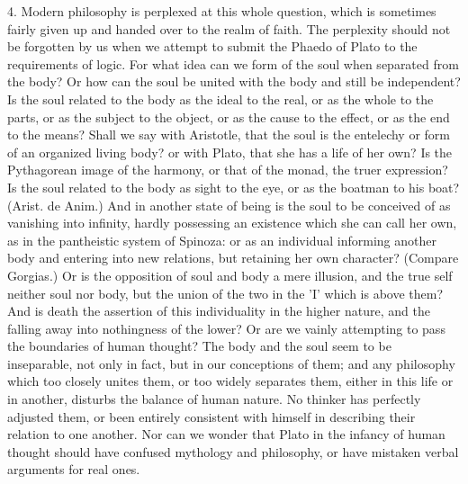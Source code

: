 \documentclass[11pt,letter]{article}
\begin{document}
\par  4. Modern philosophy is perplexed at this whole question, which is sometimes fairly given up and handed over to the realm of faith. The perplexity should not be forgotten by us when we attempt to submit the Phaedo of Plato to the requirements of logic. For what idea can we form of the soul when separated from the body? Or how can the soul be united with the body and still be independent? Is the soul related to the body as the ideal to the real, or as the whole to the parts, or as the subject to the object, or as the cause to the effect, or as the end to the means? Shall we say with Aristotle, that the soul is the entelechy or form of an organized living body? or with Plato, that she has a life of her own? Is the Pythagorean image of the harmony, or that of the monad, the truer expression? Is the soul related to the body as sight to the eye, or as the boatman to his boat? (Arist. de Anim.) And in another state of being is the soul to be conceived of as vanishing into infinity, hardly possessing an existence which she can call her own, as in the pantheistic system of Spinoza: or as an individual informing another body and entering into new relations, but retaining her own character? (Compare Gorgias.) Or is the opposition of soul and body a mere illusion, and the true self neither soul nor body, but the union of the two in the 'I' which is above them? And is death the assertion of this individuality in the higher nature, and the falling away into nothingness of the lower? Or are we vainly attempting to pass the boundaries of human thought? The body and the soul seem to be inseparable, not only in fact, but in our conceptions of them; and any philosophy which too closely unites them, or too widely separates them, either in this life or in another, disturbs the balance of human nature. No thinker has perfectly adjusted them, or been entirely consistent with himself in describing their relation to one another. Nor can we wonder that Plato in the infancy of human thought should have confused mythology and philosophy, or have mistaken verbal arguments for real ones.
\end{document}
